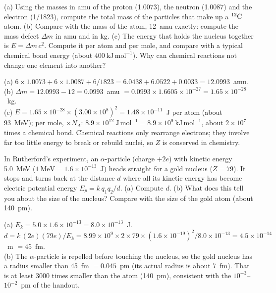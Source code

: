 (a) Using the masses in amu of the proton (1.0073), the neutron (1.0087) and the electron
(1/1823), compute the total mass of the particles that make up a ${}^{12}\mathrm{C}$ atom. (b) Compare with
the mass of the atom, 12~amu exactly: compute the mass defect $\Delta m$ in amu and in kg. (c) The
energy that holds the nucleus together is $E = \Delta m\,c^2$. Compute it per atom and per mole, and
compare with a typical chemical bond energy (about $400\ \mathrm{kJ\,mol^{-1}}$). Why can chemical
reactions not change one element into another?
\begin{solution}
(a) $6\times1.0073 + 6\times1.0087 + 6/1823 = 6.0438 + 6.0522 + 0.0033 = 12.0993$~amu.\\
(b) $\Delta m = 12.0993 - 12 = 0.0993$~amu $= 0.0993\times1.6605\times10^{-27} = 1.65\times10^{-28}$~kg.\\
(c) $E = 1.65\times10^{-28}\times(3.00\times10^8)^2 = 1.48\times10^{-11}$~J per atom (about 93~MeV);
per mole, $\times N_A$: $8.9\times10^{12}\ \mathrm{J\,mol^{-1}} = 8.9\times10^{9}\ \mathrm{kJ\,mol^{-1}}$,
about $2\times10^7$ times a chemical bond. Chemical reactions only rearrange electrons; they involve far
too little energy to break or rebuild nuclei, so $Z$ is conserved in chemistry.
\end{solution}

In Rutherford's experiment, an $\alpha$-particle (charge $+2e$) with kinetic energy 5.0~MeV
($1\ \mathrm{MeV} = 1.6\times10^{-13}$~J) heads straight for a gold nucleus ($Z = 79$). It stops and
turns back at the distance $d$ where all its kinetic energy has become electric potential energy
$E_p = k\,q_1q_2/d$. (a) Compute $d$. (b) What does this tell you about the size of the nucleus?
Compare with the size of the gold atom (about 140~pm).
\begin{solution}
(a) $E_k = 5.0\times1.6\times10^{-13} = 8.0\times10^{-13}$~J.
$d = k\,(2e)(79e)/E_k = 8.99\times10^9\times2\times79\times(1.6\times10^{-19})^2/8.0\times10^{-13}
= 4.5\times10^{-14}$~m $= 45$~fm.\\
(b) The $\alpha$-particle is repelled before touching the nucleus, so the gold nucleus has a radius
smaller than 45~fm $= 0.045$~pm (its actual radius is about 7~fm). That is at least 3000 times
smaller than the atom (140~pm), consistent with the $10^{-3}$--$10^{-2}$~pm of the handout.
\end{solution}
